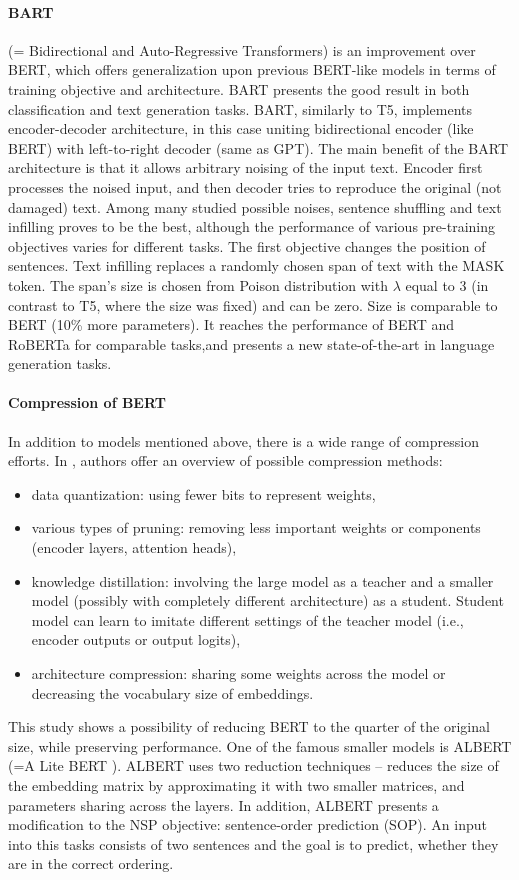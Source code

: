 \paragraph{BART} (= Bidirectional and Auto-Regressive Transformers) \citep{Lewis2019} is an improvement over BERT, which offers generalization upon previous BERT-like models in terms of training objective and architecture. BART presents the good result in both classification and text generation tasks. BART, similarly to T5, implements encoder-decoder architecture, in this case uniting bidirectional encoder (like BERT) with left-to-right decoder (same as GPT). The main benefit of the BART architecture is that it allows arbitrary noising of the input text. Encoder first processes the noised input, and then decoder tries to reproduce the original (not damaged) text. Among many studied possible noises, sentence shuffling and text infilling proves to be the best, although the performance of various pre-training objectives varies for different tasks. The first objective changes the position of sentences. Text infilling replaces a randomly chosen span of text with the MASK token. The span's size is chosen from Poison distribution with $\lambda$ equal to 3 (in contrast to T5, where the size was fixed) and can be zero. Size is comparable to BERT (10\% more parameters). It reaches the performance of BERT and RoBERTa  for comparable tasks,and presents a new state-of-the-art in language generation tasks.
\paragraph{Compression of BERT} In addition to models mentioned above, there is a wide range of compression efforts.  In \citet{Ganesh2020}, authors offer an overview of possible compression methods:
\begin{itemize}
\item data quantization: using fewer bits to represent weights,
\item various types of pruning: removing less important weights or components (encoder layers, attention heads),
\item knowledge distillation: involving the large model as a teacher and a smaller model (possibly with completely different architecture) as a student. Student model can learn to imitate different settings of the teacher model (i.e., encoder outputs or output logits),
\item architecture compression: sharing some weights across the model or decreasing the vocabulary size of embeddings.
\end{itemize}
This study shows a possibility of reducing BERT to the quarter of the original size, while preserving performance. One of the famous smaller models is ALBERT (=A Lite BERT \citep{Lan2019}). ALBERT uses two reduction techniques -- reduces the size of the embedding matrix by approximating it with two smaller matrices, and parameters sharing across the layers. In addition, ALBERT presents a modification to the NSP objective: sentence-order prediction (SOP). An input into this tasks consists of two sentences and the goal is to predict, whether they are in the correct ordering.
